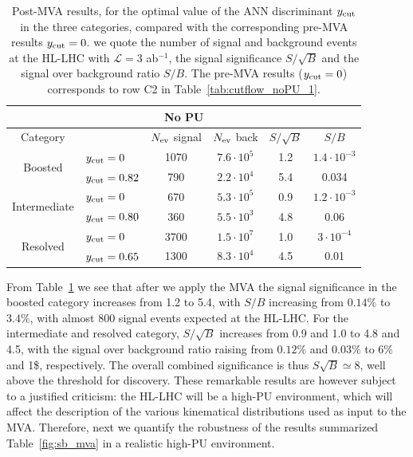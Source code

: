 \begin{table}[t]
  \centering
  \begin{tabular}{|c|l|c|c|c|c|}
    \hline
    \multicolumn{6}{|c|}{No PU} \\
    \hline
    \hline
    Category  &   &  $N_{\rm ev}$ signal &  $N_{\rm ev}$ back  &  $S/\sqrt{B}$ & $S/B$ \\ 
    \hline
    \hline
    \multirow{2}{*}{Boosted} &  $y_{\rm cut}=0$  & 1070 & $7.6\cdot 10^5$  & 1.2  & $1.4\cdot 10^{-3}$  \\
    &  $y_{\rm cut}=0.82$ & 790  & $2.2\cdot 10^4$   & 5.4  & 0.034 \\
    \hline
    \hline
    \multirow{2}{*}{Intermediate} &  $y_{\rm cut}=0$  & 670   & $5.3\cdot 10^5$
    & 0.9 & $1.2\cdot 10^{-3}$ \\
    &  $y_{\rm cut}=0.80$ & 360  & $5.5\cdot 10^3$  & 4.8 & 0.06\\
    \hline
    \hline
      \multirow{2}{*}{Resolved} &  $y_{\rm cut}=0$  & 3700 &  $1.5\cdot 10^{7}$ &  1.0 &$3\cdot 10^{-4}$ \\
    &  $y_{\rm cut}=0.65$ & 1300  & $8.3\cdot 10^{4}$ & 4.5 & 0.01 \\
    \hline
      \end{tabular}
  \caption{\small Post-MVA results, for the optimal value of the
    ANN discriminant $y_{\rm cut}$ in the three categories, compared with the
    corresponding
    pre-MVA results $y_{\rm cut}=0$.
    we quote the number of signal and
    background events
    at the HL-LHC with $\mathcal{L}=3$ ab$^{-1}$,
    the signal significance $S/\sqrt{B}$ and
    the signal over background ratio $S/B$.
    The pre-MVA results ($y_{\rm cut}=0$) corresponds to row C2 in
    Table~\ref{tab:cutflow_noPU_1}.
    \label{table:cutflowMVA}
  }
\end{table}




From Table~\ref{table:cutflowMVA} we see that
after we apply the MVA
the signal significance in the boosted category increases
from 1.2 to 5.4, with $S/B$ increasing from $0.14\%$ to $3.4\%$,
with almost 800 signal events expected at the HL-LHC.
%
For the intermediate and resolved category, $S/\sqrt{B}$
increases from 0.9 and 1.0 to 4.8 and 4.5, with
the signal over background ratio raising from
$0.12\%$ and $0.03\%$ to 6\% and 1\$, respectively.
%
The overall combined significance is thus $S\sqrt{B}\simeq 8$,
well above the threshold for discovery.
%
These remarkable results are however subject to a justified
criticism:
the HL-LHC will be a high-PU environment,
which will affect the description of the various
kinematical distributions used as input to the MVA.
%
Therefore, next we quantify the robustness of the
results summarized Table~\ref{fig:sb_mva}
in a realistic high-PU environment.

